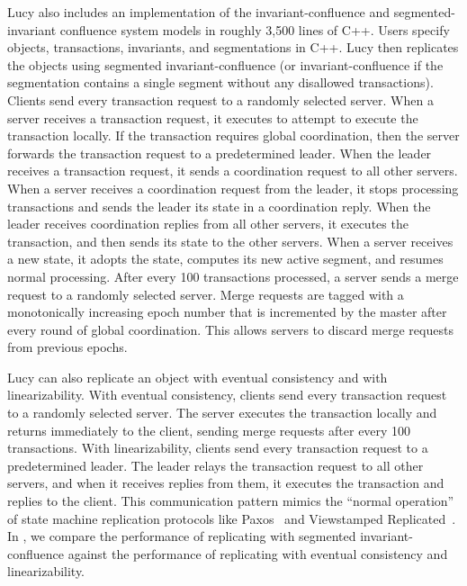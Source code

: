 Lucy also includes an implementation of the invariant-confluence and
segmented-invariant confluence system models in roughly 3,500 lines of C++.
Users specify objects, transactions, invariants, and segmentations in C++. Lucy
then replicates the objects using segmented invariant-confluence (or
invariant-confluence if the segmentation contains a single segment without any
disallowed transactions). Clients send every transaction request to a randomly
selected server. When a server receives a transaction request, it executes
 to attempt to execute the transaction locally. If the
transaction requires global coordination, then the server forwards the
transaction request to a predetermined leader. When the leader receives a
transaction request, it sends a coordination request to all other servers. When
a server receives a coordination request from the leader, it stops processing
transactions and sends the leader its state in a coordination reply. When the
leader receives coordination replies from all other servers, it executes the
transaction, and then sends its state to the other servers. When a server
receives a new state, it adopts the state, computes its new active segment, and
resumes normal processing. After every 100 transactions processed, a server
sends a merge request to a randomly selected server. Merge requests are tagged
with a monotonically increasing epoch number that is incremented by the master
after every round of global coordination. This allows servers to discard merge
requests from previous epochs.

Lucy can also replicate an object with eventual consistency and with
linearizability. With eventual consistency, clients send every transaction
request to a randomly selected server. The server executes the transaction
locally and returns immediately to the client, sending merge requests after
every 100 transactions. With linearizability, clients send every transaction
request to a predetermined leader. The leader relays the transaction request to
all other servers, and when it receives replies from them, it executes the
transaction and replies to the client. This communication pattern mimics the
``normal operation'' of state machine replication protocols like
Paxos~\cite{lamport1998part} and Viewstamped
Replicated~\cite{liskov2012viewstamped}. In
, we compare the performance of
replicating with segmented invariant-confluence against the performance of
replicating with eventual consistency and linearizability.

